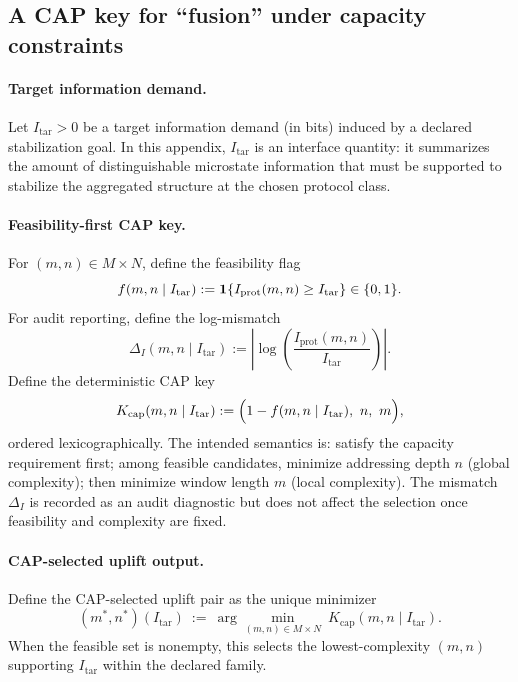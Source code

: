 \subsection{A CAP key for ``fusion'' under capacity constraints}
\label{subsec:uplift_cap_key}

\paragraph{Target information demand.}
\InterfaceTag Let $I_{\mathrm{tar}}>0$ be a target information demand (in bits) induced by a declared stabilization goal.
In this appendix, $I_{\mathrm{tar}}$ is an interface quantity: it summarizes the amount of distinguishable microstate information that must be supported to stabilize the aggregated structure at the chosen protocol class.

\paragraph{Feasibility-first CAP key.}
\AuditTag For $(m,n)\in M\times N$, define the feasibility flag
\[
f(m,n\mid I_{\mathrm{tar}}):=\mathbf{1}\!\left\{I_{\mathrm{prot}}(m,n)\ge I_{\mathrm{tar}}\right\}\in\{0,1\}.
\]
\AuditTag For audit reporting, define the log-mismatch
\[
\Delta_I(m,n\mid I_{\mathrm{tar}}):=\left|\log\!\left(\frac{I_{\mathrm{prot}}(m,n)}{I_{\mathrm{tar}}}\right)\right|.
\]
Define the deterministic CAP key
\begin{equation}\label{eq:uplift_cap_key_def}
K_{\mathrm{cap}}(m,n\mid I_{\mathrm{tar}})
:=
\Bigl(1-f(m,n\mid I_{\mathrm{tar}}),\ n,\ m\Bigr),
\end{equation}
ordered lexicographically.
The intended semantics is: satisfy the capacity requirement first; among feasible candidates, minimize addressing depth $n$ (global complexity); then minimize window length $m$ (local complexity).
The mismatch $\Delta_I$ is recorded as an audit diagnostic but does not affect the selection once feasibility and complexity are fixed.

\paragraph{CAP-selected uplift output.}
\AuditTag Define the CAP-selected uplift pair as the unique minimizer
\begin{equation}\label{eq:uplift_cap_minimizer_def}
(m^\ast,n^\ast)(I_{\mathrm{tar}})\ :=\ \arg\min_{(m,n)\in M\times N}\ K_{\mathrm{cap}}(m,n\mid I_{\mathrm{tar}}).
\end{equation}
When the feasible set is nonempty, this selects the lowest-complexity $(m,n)$ supporting $I_{\mathrm{tar}}$ within the declared family.

